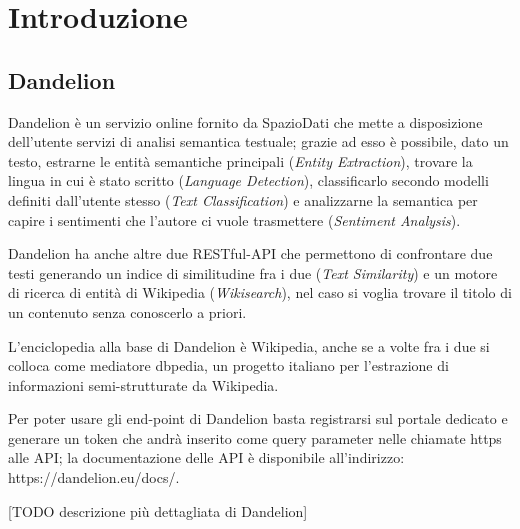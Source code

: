 \chapter{Introduzione}
\section{Dandelion}

Dandelion è un servizio online fornito da SpazioDati che mette a disposizione dell'utente servizi di analisi semantica testuale; 
grazie ad esso è possibile, dato un testo, estrarne le entità semantiche principali (\textit{Entity Extraction}), trovare la lingua in cui è stato 
scritto (\textit{Language Detection}), classificarlo secondo modelli definiti dall'utente stesso (\textit{Text Classification}) e analizzarne la semantica 
per capire i sentimenti che l'autore ci vuole trasmettere (\textit{Sentiment Analysis}). 

Dandelion ha anche altre due RESTful-API che permettono di confrontare due testi generando un indice di similitudine fra i due (\textit{Text Similarity}) e
un motore di ricerca di entità di Wikipedia (\textit{Wikisearch}), nel caso si voglia trovare il titolo di un contenuto senza conoscerlo a priori.

L'enciclopedia alla base di Dandelion è Wikipedia, anche se a volte fra i due si colloca come mediatore dbpedia, un progetto italiano per l'estrazione di 
informazioni semi-strutturate da Wikipedia. 

Per poter usare gli end-point di Dandelion basta registrarsi sul portale dedicato e generare un token che andrà inserito come query parameter nelle chiamate https alle API;
la documentazione delle API è disponibile all'indirizzo: https://dandelion.eu/docs/.

[TODO descrizione più dettagliata di Dandelion]

